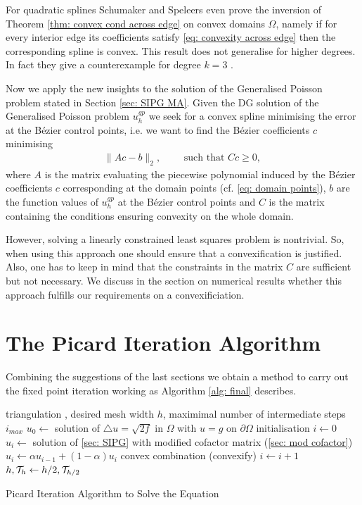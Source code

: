 For quadratic splines Schumaker and Speleers even prove the inversion of Theorem \ref{thm: convex cond across edge} on convex domains $\Omega$, namely if for every interior edge its coefficients satisfy \eqref{eq: convexity across edge} then the corresponding spline is convex.
This result does not generalise for higher degrees. In fact they give a counterexample for degree $k = 3$ \cite[Example 3.11]{SS2014}.

Now we apply the new insights to the solution of the Generalised Poisson problem stated in Section \ref{sec: SIPG MA}.
Given the DG solution of the Generalised Poisson problem $u^{gp}_h$ we seek for a convex spline minimising the error at the B\'ezier control points, i.e. we want to find the B\'ezier coefficients $c$ minimising
\begin{align}
		\lVert A c - b \rVert_2, \qquad \text{ such that } Cc \geq 0, \label{eq: convex lsq}
\end{align}
where $A$ is the matrix evaluating the piecewise polynomial induced by the B\'ezier coefficients $c$ corresponding  at the domain points (cf. \eqref{eq: domain points}), $b$ are the function values of $u^{gp}_h$ at the B\'ezier control points and $C$ is the matrix containing the conditions ensuring convexity on the whole domain.

However, solving a linearly constrained least squares problem is nontrivial. So, when using this approach one should ensure that a convexification is justified. Also, one has to keep in mind that the constraints in the matrix $C$ are sufficient but not necessary. We discuss in the section on numerical results whether this approach fulfills our requirements on a convexificiation.

\section{The Picard Iteration Algorithm}

Combining the suggestions of the last sections we obtain a method to carry out the fixed point iteration working as Algorithm \ref{alg: final} describes.

\begin{algorithm}
\begin{algorithmic}
\Require triangulation \triang, desired mesh width $h$, maximimal number of intermediate steps $i_{max}$
\State $u_0\gets $ solution of  $
	\triangle u = \sqrt{2f} \text{ in } \Omega $ with $
	u = g \text{ on }\partial \Omega$ \Comment initialisation
	\State $i \gets 0$
		\State $u_i \gets$ solution of \ref{sec: SIPG} with modified cofactor matrix (\ref{sec: mod cofactor})
		\State $u_i \gets \alpha u_{i-1} + (1-\alpha)u_i $ \Comment convex combination
		\State (convexify)
		\State $i \gets i+1$
	\EndWhile
	\State $h, \mathcal{T}_h \gets h/2, \mathcal{T}_{h/2}$
\EndWhile
\end{algorithmic}
\caption{Picard Iteration Algorithm to Solve the \MA Equation}
\label{alg: final}
\end{algorithm}

